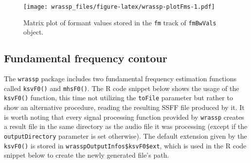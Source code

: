 \documentclass[]{book}
\newenvironment{Shaded}{\begin{snugshade}}{\end{snugshade}}
\newcommand{\CommentTok}[1]{\textcolor[rgb]{0.56,0.35,0.01}{\textit{#1}}}
\newcommand{\DataTypeTok}[1]{\textcolor[rgb]{0.13,0.29,0.53}{#1}}
\newcommand{\DecValTok}[1]{\textcolor[rgb]{0.00,0.00,0.81}{#1}}
\newcommand{\KeywordTok}[1]{\textcolor[rgb]{0.13,0.29,0.53}{\textbf{#1}}}
\newcommand{\NormalTok}[1]{#1}
\newcommand{\OperatorTok}[1]{\textcolor[rgb]{0.81,0.36,0.00}{\textbf{#1}}}
\newcommand{\StringTok}[1]{\textcolor[rgb]{0.31,0.60,0.02}{#1}}
\begin{document}
\begin{Shaded}
\end{Shaded}

\begin{figure}
\centering
\texttt{[image: wrassp\_files/figure-latex/wrassp-plotFms-1.pdf]}
\caption{\label{fig:wrassp-plotFms}Matrix plot of formant values stored in the \texttt{fm} track of \texttt{fmBwVals} object.}
\end{figure}

\hypertarget{subsec:wrassp_f0}{%
\subsection{Fundamental frequency contour}\label{subsec:wrassp_f0}}

The \texttt{wrassp} package includes two fundamental frequency estimation functions called \texttt{ksvF0()} and \texttt{mhsF0()}. The R code snippet below shows the usage of the \texttt{ksvF0()} function, this time not utilizing the \texttt{toFile} parameter but rather to show an alternative procedure, reading the resulting SSFF file produced by it. It is worth noting that every signal processing function provided by \texttt{wrassp} creates a result file in the same directory as the audio file it was processing (except if the \texttt{outputDirectory} parameter is set otherwise). The default extension given by the \texttt{ksvF0()} is stored in \texttt{wrasspOutputInfos\$ksvF0\$ext}, which is used in the R code snippet below to create the newly generated file's path.
\end{document}
